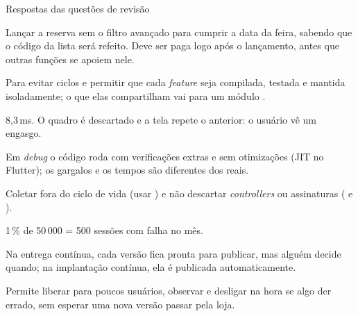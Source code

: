 \documentclass[aspectratio=169,10pt]{beamer}
\begin{document}
\begin{frame}{Respostas das questões de revisão}
  \begin{respostas}
    \item Lançar a reserva sem o filtro avançado para cumprir a data da feira, sabendo que o código da lista será refeito. Deve ser paga logo após o lançamento, antes que outras funções se apoiem nele.
    \item Para evitar ciclos e permitir que cada \emph{feature} seja compilada, testada e mantida isoladamente; o que elas compartilham vai para um módulo .
    \item 8,3\,ms. O quadro é descartado e a tela repete o anterior: o usuário vê um engasgo.
    \item Em \emph{debug} o código roda com verificações extras e sem otimizações (JIT no Flutter); os gargalos e os tempos são diferentes dos reais.
    \item Coletar  fora do ciclo de vida (usar ) e não descartar \emph{controllers} ou assinaturas ( e ).
    \item 1\,\% de 50\,000 = 500 sessões com falha no mês.
    \item Na entrega contínua, cada versão fica pronta para publicar, mas alguém decide quando; na implantação contínua, ela é publicada automaticamente.
    \item Permite liberar para poucos usuários, observar e desligar na hora se algo der errado, sem esperar uma nova versão passar pela loja.
  \end{respostas}
\end{frame}

\end{document}
